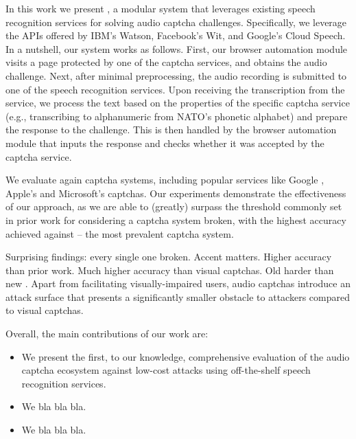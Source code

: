 In this work we present \system, a modular system that leverages existing speech recognition services
for solving audio captcha challenges. Specifically, we leverage the
APIs offered by IBM's Watson, Facebook's Wit, and Google's Cloud Speech. In a nutshell, our system works as
follows. First, our browser automation module visits a page protected by one of the captcha services,
and obtains the audio challenge. Next, after minimal preprocessing, the audio recording is submitted 
to one of the speech recognition services. Upon receiving the transcription from the service, we 
process the text based on the properties of the specific captcha service (e.g., transcribing to alphanumeric 
from NATO's phonetic alphabet) and prepare the response to the challenge. This is then handled by
the browser automation module that inputs the response and checks whether it was accepted by the captcha
service.

We evaluate \system again \no captcha systems, including popular services like Google \re,
Apple's and Microsoft's captchas. Our experiments demonstrate the effectiveness of our approach,
as we are able to (greatly) surpass the threshold commonly set in prior work for considering
a captcha system broken, with the highest accuracy achieved against \re -- the most prevalent 
captcha system.

Surprising findings: every single one broken. Accent matters. Higher accuracy than prior work. Much higher accuracy than
visual captchas. Old \re harder than new \re. 
Apart from facilitating visually-impaired users, audio captchas introduce an attack
surface that presents a significantly smaller obstacle to attackers compared to visual captchas.

Overall, the main contributions of our work are:

\begin{itemize}

\item We present the first, to our knowledge, comprehensive evaluation of 
the audio captcha ecosystem against low-cost 
attacks using off-the-shelf speech recognition services.

\item We bla bla bla.

\item We bla bla bla.

\end{itemize}
